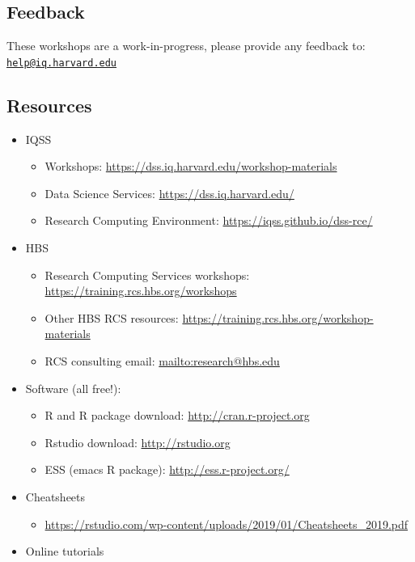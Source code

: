 \documentclass[]{book}
\providecommand{\tightlist}{%
  \setlength{\itemsep}{0pt}\setlength{\parskip}{0pt}}
\begin{document}
\hypertarget{feedback-1}{%
\subsection{Feedback}\label{feedback-1}}

These workshops are a work-in-progress, please provide any feedback to: \href{mailto:help@iq.harvard.edu}{\nolinkurl{help@iq.harvard.edu}}

\hypertarget{resources-1}{%
\subsection{Resources}\label{resources-1}}

\begin{itemize}
\tightlist
\item
  IQSS

  \begin{itemize}
  \tightlist
  \item
    Workshops: \url{https://dss.iq.harvard.edu/workshop-materials}
  \item
    Data Science Services: \url{https://dss.iq.harvard.edu/}
  \item
    Research Computing Environment: \url{https://iqss.github.io/dss-rce/}
  \end{itemize}
\item
  HBS

  \begin{itemize}
  \tightlist
  \item
    Research Computing Services workshops: \url{https://training.rcs.hbs.org/workshops}
  \item
    Other HBS RCS resources: \url{https://training.rcs.hbs.org/workshop-materials}
  \item
    RCS consulting email: \url{mailto:research@hbs.edu}
  \end{itemize}
\item
  Software (all free!):

  \begin{itemize}
  \tightlist
  \item
    R and R package download: \url{http://cran.r-project.org}
  \item
    Rstudio download: \url{http://rstudio.org}
  \item
    ESS (emacs R package): \url{http://ess.r-project.org/}
  \end{itemize}
\item
  Cheatsheets

  \begin{itemize}
  \tightlist
  \item
    \url{https://rstudio.com/wp-content/uploads/2019/01/Cheatsheets_2019.pdf}
  \end{itemize}
\item
  Online tutorials


\end{itemize}
\end{document}
